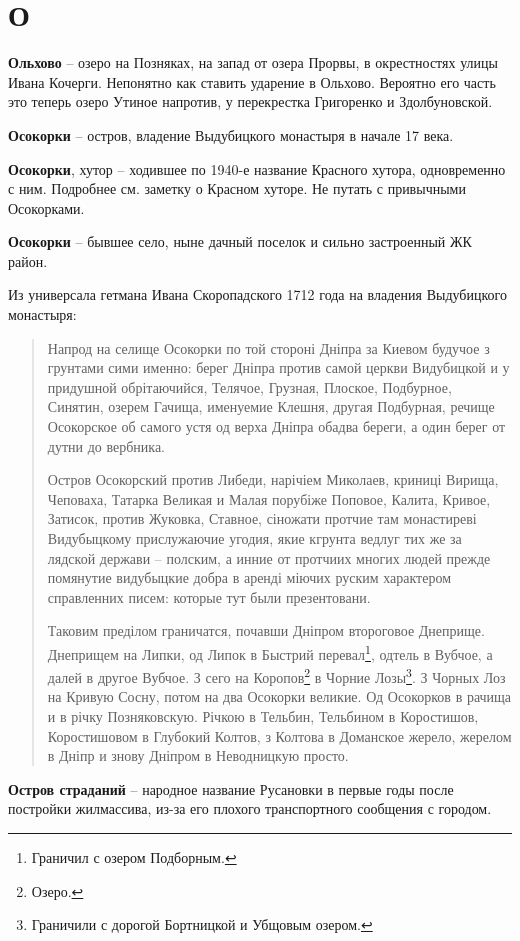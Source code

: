 \chapter*{О}

\textbf{Ольхово} – озеро на Позняках, на запад от озера Прорвы, в окрестностях улицы Ивана Кочерги. Непонятно как ставить ударение в Ольхово. Вероятно его часть это теперь озеро Утиное напротив, у перекрестка Григоренко и Здолбуновской.\\

\medskip


\textbf{Осокорки} – остров, владение Выдубицкого монастыря в начале 17 века.\\

\medskip

\textbf{Осокорки}, хутор – ходившее по 1940-е название Красного хутора, одновременно с ним. Подробнее см. заметку о Красном хуторе. Не путать с привычными Осокорками.\\

\medskip

\textbf{Осокорки} – бывшее село, ныне дачный поселок и сильно застроенный ЖК район.

Из универсала гетмана Ивана Скоропадского 1712 года на владения Выдубицкого монастыря:

\begin{quotation}
Напрод на селище Осокорки по той стороні Дніпра за Киевом будучое з грунтами сими именно: берег Дніпра против самой церкви Видубицкой и у придушной обрітаючийся, Телячое, Грузная, Плоское, Подбурное, Синятин, озерем Гачища, именуемие Клешня, другая Подбурная, речище Осокорское об самого устя од верха Дніпра обадва береги, а один берег от дутни до вербника.

Остров Осокорский против Либеди, нарічіем Миколаев, криниці Вирища, Чеповаха, Татарка Великая и Малая порубіже Поповое, Калита, Кривое, Затисок, против Жуковка, Ставное, сіножати протчие там монастиреві Видубыцкому прислужаючие угодия, якие кгрунта ведлуг тих же за лядской держави – полским, а инние от протчиих многих людей прежде помянутие видубыцкие добра в аренді міючих руским характером справленних писем: которые тут были презентовани.

Таковим преділом граничатся, почавши Дніпром второговое Днеприще. Днеприщем на Липки, од Липок в Быстрий перевал\footnote{Граничил с озером Подборным.}, одтель в Вубчое, а далей в другое Вубчое. З сего на Коропов\footnote{Озеро.} в Чорние Лозы\footnote{Граничили с дорогой Бортницкой и Убщовым озером.}. З Чорных Лоз на Кривую Сосну, потом на два Осокорки великие. Од Осокорков в рачища и в річку Позняковскую. Річкою в Тельбин, Тельбином в Коростишов, Коростишовом в Глубокий Колтов, з Колтова в Доманское жерело, жерелом в Дніпр и знову Дніпром в Неводницкую просто.
\end{quotation}

\medskip

\textbf{Остров страданий} – народное название Русановки в первые годы после постройки жилмассива, из-за его плохого транспортного сообщения с городом.

